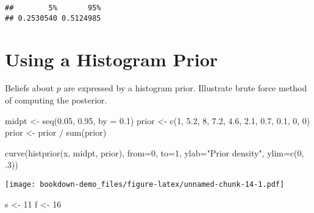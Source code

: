 \documentclass[
]{book}
\newenvironment{Shaded}{\begin{snugshade}}{\end{snugshade}}
\newcommand{\AttributeTok}[1]{\textcolor[rgb]{0.77,0.63,0.00}{#1}}
\newcommand{\DecValTok}[1]{\textcolor[rgb]{0.00,0.00,0.81}{#1}}
\newcommand{\FloatTok}[1]{\textcolor[rgb]{0.00,0.00,0.81}{#1}}
\newcommand{\FunctionTok}[1]{\textcolor[rgb]{0.00,0.00,0.00}{#1}}
\newcommand{\NormalTok}[1]{#1}
\newcommand{\OtherTok}[1]{\textcolor[rgb]{0.56,0.35,0.01}{#1}}
\newcommand{\SpecialCharTok}[1]{\textcolor[rgb]{0.00,0.00,0.00}{#1}}
\newcommand{\StringTok}[1]{\textcolor[rgb]{0.31,0.60,0.02}{#1}}
\begin{document}
\begin{verbatim}
##        5%       95% 
## 0.2530540 0.5124985
\end{verbatim}

\hypertarget{using-a-histogram-prior}{%
\section{Using a Histogram Prior}\label{using-a-histogram-prior}}

Beliefs about \(p\) are expressed by a histogram prior. Illustrate brute force method of computing the posterior.

\begin{Shaded}
\begin{Highlighting}[]
\NormalTok{midpt }\OtherTok{\textless{}{-}} \FunctionTok{seq}\NormalTok{(}\FloatTok{0.05}\NormalTok{, }\FloatTok{0.95}\NormalTok{, }\AttributeTok{by =} \FloatTok{0.1}\NormalTok{)}
\NormalTok{prior }\OtherTok{\textless{}{-}} \FunctionTok{c}\NormalTok{(}\DecValTok{1}\NormalTok{, }\FloatTok{5.2}\NormalTok{, }\DecValTok{8}\NormalTok{, }\FloatTok{7.2}\NormalTok{, }\FloatTok{4.6}\NormalTok{, }\FloatTok{2.1}\NormalTok{, }\FloatTok{0.7}\NormalTok{, }
           \FloatTok{0.1}\NormalTok{, }\DecValTok{0}\NormalTok{, }\DecValTok{0}\NormalTok{)}
\NormalTok{prior }\OtherTok{\textless{}{-}}\NormalTok{ prior }\SpecialCharTok{/} \FunctionTok{sum}\NormalTok{(prior)}
\end{Highlighting}
\end{Shaded}

\begin{Shaded}
\begin{Highlighting}[]
\FunctionTok{curve}\NormalTok{(}\FunctionTok{histprior}\NormalTok{(x, midpt, prior), }\AttributeTok{from=}\DecValTok{0}\NormalTok{, }\AttributeTok{to=}\DecValTok{1}\NormalTok{,}
   \AttributeTok{ylab=}\StringTok{"Prior density"}\NormalTok{, }\AttributeTok{ylim=}\FunctionTok{c}\NormalTok{(}\DecValTok{0}\NormalTok{, .}\DecValTok{3}\NormalTok{))}
\end{Highlighting}
\end{Shaded}

\texttt{[image: bookdown-demo\_files/figure-latex/unnamed-chunk-14-1.pdf]}

\begin{Shaded}
\begin{Highlighting}[]
\NormalTok{s }\OtherTok{\textless{}{-}} \DecValTok{11}
\NormalTok{f }\OtherTok{\textless{}{-}} \DecValTok{16}
\end{Highlighting}
\end{Shaded}
\end{document}
